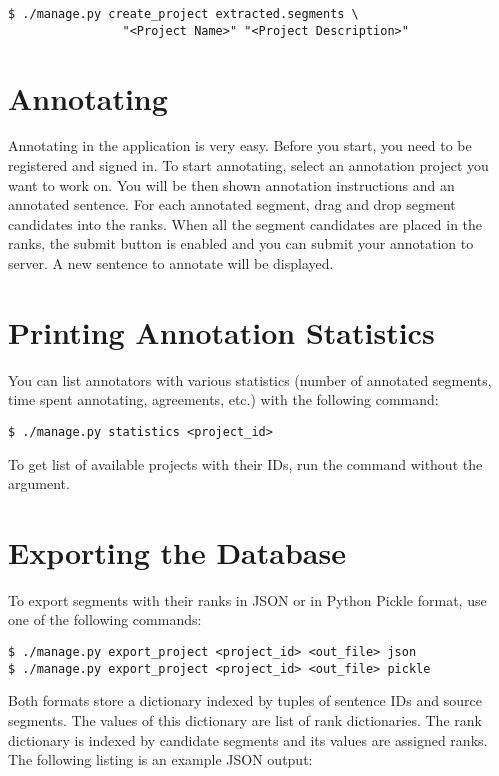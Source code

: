 \begin{verbatim}
$ ./manage.py create_project extracted.segments \
                "<Project Name>" "<Project Description>"
\end{verbatim}

\section{Annotating}

Annotating in the application is very easy. Before you start, you need to be
registered and signed in. To start annotating, select an annotation project you
want to work on. You will be then shown annotation instructions and an
annotated sentence.  For each annotated segment, drag and drop segment
candidates into the ranks.  When all the segment candidates are placed in the
ranks, the submit button is enabled and you can submit your annotation to
server. A new sentence to annotate will be displayed. 

\section{Printing Annotation Statistics}

You can list annotators with various statistics (number of annotated segments,
time spent annotating, agreements, etc.) with the following command:

\begin{verbatim}
$ ./manage.py statistics <project_id>
\end{verbatim}

\noindent
To get list of available projects with their IDs, run the command without the
argument.

\section{Exporting the Database}

To export segments with their ranks in JSON or in Python Pickle format, use one
of the following commands:

\begin{verbatim}
$ ./manage.py export_project <project_id> <out_file> json
$ ./manage.py export_project <project_id> <out_file> pickle
\end{verbatim}

\noindent Both formats store a dictionary indexed by tuples of sentence IDs and
source segments. The values of this dictionary are list of rank dictionaries.
The rank dictionary is indexed by candidate segments and its values are
assigned ranks. The following listing is an example JSON output:

